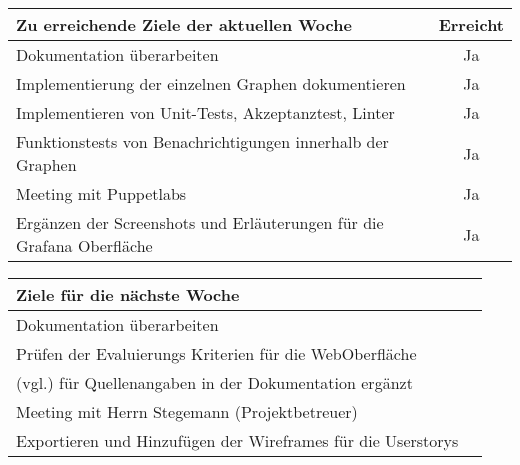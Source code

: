 \begin{tabularx}{\textwidth}{Xc}
    \arrayrulecolor{OliveGreen}
    \toprule
    {\bfseries Zu erreichende Ziele der aktuellen Woche} & {\bfseries Erreicht} \\
    \midrule[2pt]
    Dokumentation überarbeiten                              &Ja              \\
    \rowcolor{OliveGreen!15}
    Implementierung der einzelnen Graphen dokumentieren     &Ja              \\
    \rowcolor{White}
    Implementieren von Unit-Tests, Akzeptanztest, Linter    &Ja              \\
    \rowcolor{OliveGreen!15}
    Funktionstests von Benachrichtigungen innerhalb der Graphen  &Ja         \\
    \rowcolor{White}
    Meeting mit Puppetlabs                                  &Ja              \\
    \rowcolor{OliveGreen!15}
    Ergänzen der Screenshots und Erläuterungen für die Grafana Oberfläche &Ja \\
   \bottomrule[2pt]
\end{tabularx}
%
\vspace{1cm}
%
\begin{tabularx}{\textwidth}{Xc}
    \arrayrulecolor{OliveGreen}
    \toprule
    {\bfseries Ziele für die nächste Woche}        &                         \\
    \midrule[2pt]
    Dokumentation überarbeiten                     &                         \\
    \rowcolor{OliveGreen!15}
    Prüfen der Evaluierungs Kriterien für die WebOberfläche  &               \\
    \rowcolor{White}
    (vgl.) für Quellenangaben in der Dokumentation ergänzt    &                \\
    \rowcolor{OliveGreen!15}
    Meeting mit Herrn Stegemann (Projektbetreuer)      &                     \\
    \rowcolor{White}
    Exportieren und Hinzufügen der Wireframes für die Userstorys  &          \\
\end{tabularx}
